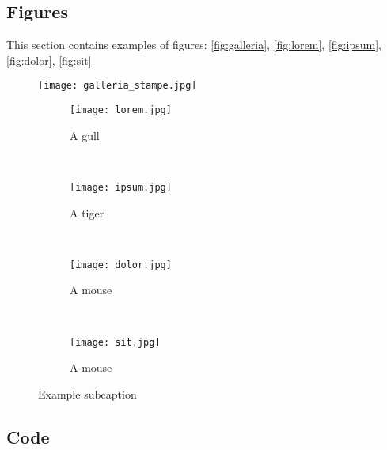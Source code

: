 \subsection{Figures}

This section contains examples of figures: \autoref{fig:galleria}, \autoref{fig:lorem}, \autoref{fig:ipsum}, \autoref{fig:dolor}, \autoref{fig:sit}

\begin{figure}[H] 
    \centering 
    \texttt{[image: galleria\_stampe.jpg]} 
    \label{fig:galleria} 
\end{figure}

\begin{figure}[H]
    \centering
    \begin{subfigure}[b]{0.45\textwidth}
	\texttt{[image: lorem.jpg]}
	\caption{A gull}
        \label{fig:lorem}
    \end{subfigure}
    ~ %
    \begin{subfigure}[b]{0.45\textwidth}
	\texttt{[image: ipsum.jpg]}
	\caption{A tiger}
	\label{fig:ipsum}
    \end{subfigure}
    ~ %
    \begin{subfigure}[b]{0.45\textwidth}
	\texttt{[image: dolor.jpg]}
	\caption{A mouse}
	\label{fig:dolor}
    \end{subfigure}
    ~ %
    \begin{subfigure}[b]{0.45\textwidth}
	\texttt{[image: sit.jpg]}
	\caption{A mouse}
	\label{fig:sit}
    \end{subfigure}
    \caption{Example subcaption}\label{fig:animals}
\end{figure}


\subsection{Code}

